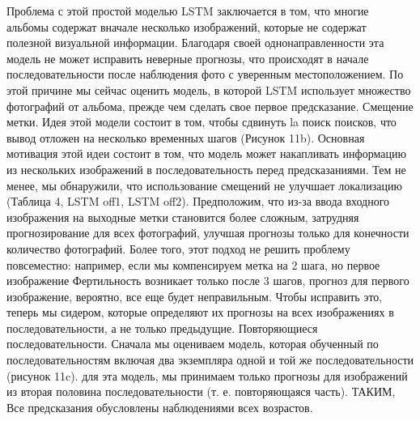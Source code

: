 Проблема с этой простой моделью LSTM заключается в том, что многие
альбомы содержат вначале несколько изображений, которые
не содержат полезной визуальной информации. Благодаря своей однонаправленности эта модель не может исправить неверные прогнозы, что
происходят в начале последовательности после наблюдения
фото с уверенным местоположением. По этой причине мы сейчас
оценить модель, в которой LSTM использует множество фотографий
от альбома, прежде чем сделать свое первое предсказание.
Смещение метки. Идея этой модели состоит в том, чтобы сдвинуть la
поиск поисков, что вывод отложен на несколько временных шагов
(Рисунок 11b). Основная мотивация этой идеи состоит в том, что
модель может накапливать информацию из нескольких изображений в
последовательность перед предсказаниями. Тем не менее, мы
обнаружили, что использование смещений не улучшает локализацию
(Таблица 4, LSTM off1, LSTM off2). Предположим, что
из-за ввода входного изображения на выходные метки
становится более сложным, затрудняя прогнозирование
для всех фотографий, улучшая прогнозы только для конечности
количество фотографий. Более того, этот подход не
решить проблему повсеместно: например, если мы компенсируем
метка на 2 шага, но первое изображение
Фертильность возникает только после 3 шагов, прогноз для первого
изображение, вероятно, все еще будет неправильным. Чтобы исправить это, теперь мы
сидером, которые определяют их прогнозы на всех изображениях
в последовательности, а не только предыдущие. Повторяющиеся последовательности. Сначала мы оцениваем модель, которая
обученный по последовательностям
включая два экземпляра одной и той же последовательности (рисунок 11c). для
эта модель, мы принимаем только прогнозы для изображений из
вторая половина последовательности (т. е. повторяющаяся часть). ТАКИМ,
Все предсказания обусловлены наблюдениями всех
возрастов. 

